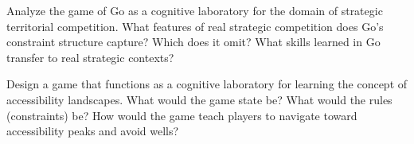 \begin{exercise}
  Analyze the game of Go as a cognitive laboratory for the domain of
  strategic territorial competition. What features of real strategic
  competition does Go's constraint structure capture? Which does it
  omit? What skills learned in Go transfer to real strategic contexts?
\end{exercise}

\begin{exercise}
  Design a game that functions as a cognitive laboratory for
  learning the concept of accessibility landscapes. What would
  the game state be? What would the rules (constraints) be?
  How would the game teach players to navigate toward
  accessibility peaks and avoid wells?
\end{exercise}
